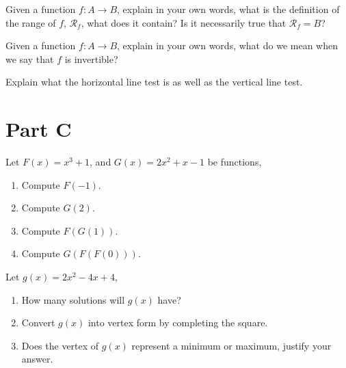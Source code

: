 \documentclass[12pt]{article} %
\begin{document}
\begin{qstn}
  Given a function $f \colon A \to B$, explain in your own words, what is the definition of the range of $f$, 
  $\mathcal{R}_f$, what does it contain? Is it necessarily true that $\mathcal{R}_f = B$?
\end{qstn}

\vspace*{5cm}

\begin{qstn}
  Given a function $f \colon A \to B$, explain in your own words, what do we mean when we say that $f$ is
  invertible?
\end{qstn}

\vspace*{5cm}

\begin{qstn}
  Explain what the horizontal line test is as well as the vertical line test.
\end{qstn}

\newpage

\section*{Part C}

\begin{qstn}
  Let $F(x) = x^3  + 1$, and $G(x) = 2x^2 + x - 1$ be functions,
  \begin{enumerate}[label=(\alph*)]
    \item Compute $F(-1)$.
      \vspace*{4cm}

    \item Compute  $G(2)$. 
      \vspace*{4cm}

    \item Compute $F(G(1))$. 
      \vspace*{5cm}

    \item Compute $G(F(F(0)))$.
  \end{enumerate}
\end{qstn}

\newpage

\begin{qstn}
  Let $g(x) = 2x^2 - 4x + 4$,
  \begin{enumerate}[label=(\alph*)]
    \item How many solutions will $g(x)$ have?
      \vspace*{5cm}

    \item Convert $g(x)$ into vertex form by completing the square.
      \vspace*{12cm}

    \item Does the vertex of $g(x)$ represent a minimum or maximum, justify your answer.

  \end{enumerate}
\end{qstn}
\end{document}
